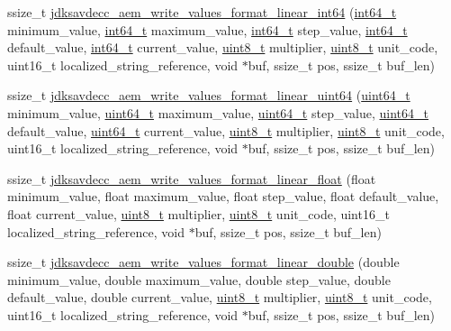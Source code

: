 \begin{DoxyCompactItemize}
ssize\+\_\+t \hyperlink{group__aem__descriptor_ga32c077be9fca842d1ac07ac50d681d5d}{jdksavdecc\+\_\+aem\+\_\+write\+\_\+values\+\_\+format\+\_\+linear\+\_\+int64} (\hyperlink{parse_8c_a67a9885ef4908cb72ce26d75b694386c}{int64\+\_\+t} minimum\+\_\+value, \hyperlink{parse_8c_a67a9885ef4908cb72ce26d75b694386c}{int64\+\_\+t} maximum\+\_\+value, \hyperlink{parse_8c_a67a9885ef4908cb72ce26d75b694386c}{int64\+\_\+t} step\+\_\+value, \hyperlink{parse_8c_a67a9885ef4908cb72ce26d75b694386c}{int64\+\_\+t} default\+\_\+value, \hyperlink{parse_8c_a67a9885ef4908cb72ce26d75b694386c}{int64\+\_\+t} current\+\_\+value, \hyperlink{stdint_8h_aba7bc1797add20fe3efdf37ced1182c5}{uint8\+\_\+t} multiplier, \hyperlink{stdint_8h_aba7bc1797add20fe3efdf37ced1182c5}{uint8\+\_\+t} unit\+\_\+code, uint16\+\_\+t localized\+\_\+string\+\_\+reference, void $\ast$buf, ssize\+\_\+t pos, ssize\+\_\+t buf\+\_\+len)
\item 
ssize\+\_\+t \hyperlink{group__aem__descriptor_gaa26a600317bbc52448ee16c65f7df2fd}{jdksavdecc\+\_\+aem\+\_\+write\+\_\+values\+\_\+format\+\_\+linear\+\_\+uint64} (\hyperlink{parse_8c_aec6fcb673ff035718c238c8c9d544c47}{uint64\+\_\+t} minimum\+\_\+value, \hyperlink{parse_8c_aec6fcb673ff035718c238c8c9d544c47}{uint64\+\_\+t} maximum\+\_\+value, \hyperlink{parse_8c_aec6fcb673ff035718c238c8c9d544c47}{uint64\+\_\+t} step\+\_\+value, \hyperlink{parse_8c_aec6fcb673ff035718c238c8c9d544c47}{uint64\+\_\+t} default\+\_\+value, \hyperlink{parse_8c_aec6fcb673ff035718c238c8c9d544c47}{uint64\+\_\+t} current\+\_\+value, \hyperlink{stdint_8h_aba7bc1797add20fe3efdf37ced1182c5}{uint8\+\_\+t} multiplier, \hyperlink{stdint_8h_aba7bc1797add20fe3efdf37ced1182c5}{uint8\+\_\+t} unit\+\_\+code, uint16\+\_\+t localized\+\_\+string\+\_\+reference, void $\ast$buf, ssize\+\_\+t pos, ssize\+\_\+t buf\+\_\+len)
\item 
ssize\+\_\+t \hyperlink{group__aem__descriptor_ga9edea2fd4295d1bfb549616ede0e0f27}{jdksavdecc\+\_\+aem\+\_\+write\+\_\+values\+\_\+format\+\_\+linear\+\_\+float} (float minimum\+\_\+value, float maximum\+\_\+value, float step\+\_\+value, float default\+\_\+value, float current\+\_\+value, \hyperlink{stdint_8h_aba7bc1797add20fe3efdf37ced1182c5}{uint8\+\_\+t} multiplier, \hyperlink{stdint_8h_aba7bc1797add20fe3efdf37ced1182c5}{uint8\+\_\+t} unit\+\_\+code, uint16\+\_\+t localized\+\_\+string\+\_\+reference, void $\ast$buf, ssize\+\_\+t pos, ssize\+\_\+t buf\+\_\+len)
\item 
ssize\+\_\+t \hyperlink{group__aem__descriptor_ga5e29903c4510817f13d17b5f273f9c45}{jdksavdecc\+\_\+aem\+\_\+write\+\_\+values\+\_\+format\+\_\+linear\+\_\+double} (double minimum\+\_\+value, double maximum\+\_\+value, double step\+\_\+value, double default\+\_\+value, double current\+\_\+value, \hyperlink{stdint_8h_aba7bc1797add20fe3efdf37ced1182c5}{uint8\+\_\+t} multiplier, \hyperlink{stdint_8h_aba7bc1797add20fe3efdf37ced1182c5}{uint8\+\_\+t} unit\+\_\+code, uint16\+\_\+t localized\+\_\+string\+\_\+reference, void $\ast$buf, ssize\+\_\+t pos, ssize\+\_\+t buf\+\_\+len)

\end{DoxyCompactItemize}
